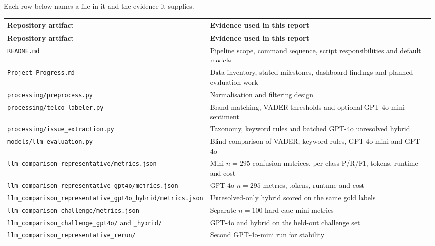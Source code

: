 \documentclass[11pt,a4paper]{article}
\begin{document}
Each row below names a file in it and the evidence it supplies.

\begin{longtable}{@{}p{}p{}@{}}
\toprule
\textbf{Repository artifact} & \textbf{Evidence used in this report} \\
\midrule
\endfirsthead
\toprule
\textbf{Repository artifact} & \textbf{Evidence used in this report} \\
\midrule
\endhead
\texttt{README.md} & Pipeline scope, command sequence, script responsibilities and default models \\
\texttt{Project\_\allowbreak{}Progress.md} & Data inventory, stated milestones, dashboard findings and planned evaluation work \\
\texttt{processing/\allowbreak{}preprocess.py} & Normalisation and filtering design \\
\texttt{processing/\allowbreak{}telco\_\allowbreak{}labeler.py} & Brand matching, VADER thresholds and optional GPT-4o-mini sentiment \\
\texttt{processing/\allowbreak{}issue\_\allowbreak{}extraction.py} & Taxonomy, keyword rules and batched GPT-4o unresolved hybrid \\
\texttt{models/\allowbreak{}llm\_\allowbreak{}evaluation.py} & Blind comparison of VADER, keyword rules, GPT-4o-mini and GPT-4o \\
\texttt{llm\_\allowbreak{}comparison\_\allowbreak{}representative/\allowbreak{}metrics.json} & Mini $n=295$ confusion matrices, per-class P/R/F1, tokens, runtime and cost \\
\texttt{llm\_\allowbreak{}comparison\_\allowbreak{}representative\_\allowbreak{}gpt4o/\allowbreak{}metrics.json} & GPT-4o $n=295$ metrics, tokens, runtime and cost \\
\texttt{llm\_\allowbreak{}comparison\_\allowbreak{}representative\_\allowbreak{}gpt4o\_\allowbreak{}hybrid/\allowbreak{}metrics.json} & Unresolved-only hybrid scored on the same gold labels \\
\texttt{llm\_\allowbreak{}comparison\_\allowbreak{}challenge/\allowbreak{}metrics.json} & Separate $n=100$ hard-case mini metrics \\
\texttt{llm\_\allowbreak{}comparison\_\allowbreak{}challenge\_\allowbreak{}gpt4o/\allowbreak{}} and \texttt{\_\allowbreak{}hybrid/\allowbreak{}} & GPT-4o and hybrid on the held-out challenge set \\
\texttt{llm\_\allowbreak{}comparison\_\allowbreak{}representative\_\allowbreak{}rerun/\allowbreak{}} & Second GPT-4o-mini run for stability \\

\end{longtable}
\end{document}
